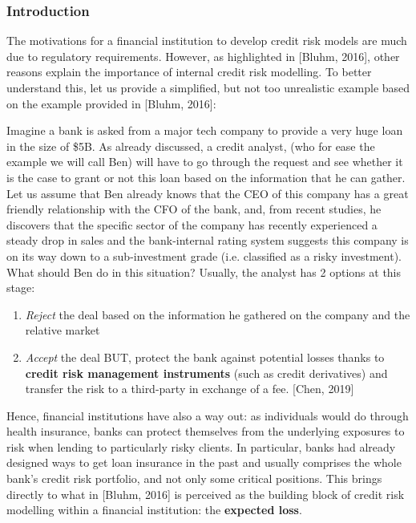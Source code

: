 \documentclass[a4paper,12pt]{article}
\begin{document}
        \subsubsection{Introduction}
        The motivations for a financial institution to develop credit risk models are much due to 
        regulatory requirements. However, as highlighted in [Bluhm, 2016], 
        other reasons explain the importance of internal credit risk modelling. 
        To better understand this, let us provide a simplified, but not too unrealistic 
        example based on the example provided in [Bluhm, 2016]: 
   
    \begin{example}

        Imagine a bank is asked from a major tech company to provide a very huge loan in the size of \$5B. 
        As already discussed, a credit analyst, (who for ease the example we will call Ben) will have to 
        go through the request and see whether it is the case to grant or not this loan based on the 
        information that he can gather. Let us assume that Ben already knows that the CEO of this company 
        has a great friendly relationship with the CFO of the bank, and, from recent studies, 
        he discovers that the specific sector of the company has recently experienced
        a steady drop in sales and the bank-internal rating system suggests this company 
        is on its way down to a sub-investment grade (i.e. classified as a risky investment). 
        What should Ben do in this situation? Usually, the analyst has 2 options at this stage:

        \begin{enumerate} \item \textit{Reject} the deal based on the information he gathered on the company and the relative market \item \textit{Accept} the deal BUT, protect the bank against potential losses thanks to \textbf{credit risk management instruments} (such as credit derivatives) and transfer the risk to a third-party in exchange of a fee. [Chen, 2019]
        \end{enumerate}

    \end{example}

    Hence, financial institutions have also a way out: as individuals would do through health insurance, 
    banks can protect themselves from the underlying exposures to risk when lending to particularly risky clients. 
    In particular, banks had already designed ways to get loan insurance in the past and usually comprises 
    the whole bank's credit risk portfolio, and not only some critical positions. 
    This brings directly to what in [Bluhm, 2016]  is perceived as the building block of 
    credit risk modelling within a financial institution: the \textbf{expected loss}.
\end{document}
